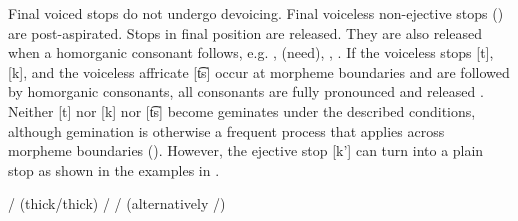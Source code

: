 Final voiced stops do not undergo devoicing. Final voiceless non-ejective stops () are post-aspirated. Stops in final position are released. They are also released when a homorganic consonant follows, e.g.  ,   (need),  ,  . If the voiceless stops [t], [k], and the voiceless affricate [t͡s] occur at morpheme boundaries and are followed by homorganic consonants, all consonants are fully pronounced and released . Neither [t] nor [k] nor [t͡s] become geminates under the described conditions, although gemination is otherwise a frequent process that applies across morpheme boundaries (). However, the ejective stop [k’] can turn into a plain stop as shown in the examples in .
%
\begin{exe}
	\ex	\label{ex:gemination A phon}
	\begin{xlist}
		\ex	{}\slash{}  (thick\slash{}thick)	\label{ex:bucce phon}
		\ex	{}\slash{} 	\label{ex:tuntce phon}
		\ex	{}\slash{}  (alternatively \slash{})	\label{ex:ikka phon}
	\end{xlist}
\end{exe}

